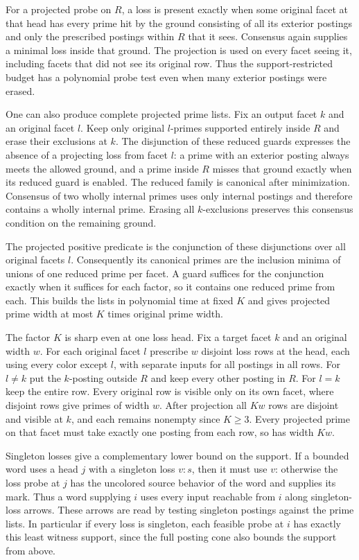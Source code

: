 For a projected probe on $R$, a loss is present
exactly when some original facet at that head has
every prime hit by the ground consisting of all
its exterior postings and only the prescribed
postings within $R$ that it sees. Consensus again
supplies a minimal loss inside that ground. The
projection is used on every facet seeing it,
including facets that did not see its original
row. Thus the support-restricted budget has a
polynomial probe test even when many exterior
postings were erased.

One can also produce complete projected prime lists.
Fix an output facet $k$ and an original facet $l$.
Keep only original $l$-primes supported entirely
inside $R$ and erase their exclusions at $k$. The
disjunction of these reduced guards expresses the
absence of a projecting loss from facet $l$: a
prime with an exterior posting always meets the
allowed ground, and a prime inside $R$ misses that
ground exactly when its reduced guard is enabled.
The reduced family is canonical after minimization.
Consensus of two wholly internal primes uses only
internal postings and therefore contains a wholly
internal prime. Erasing all $k$-exclusions preserves
this consensus condition on the remaining ground.

The projected positive predicate is the conjunction
of these disjunctions over all original facets $l$.
Consequently its canonical primes are the inclusion
minima of unions of one reduced prime per facet.
A guard suffices for the conjunction exactly when
it suffices for each factor, so it contains one
reduced prime from each. This builds the lists in
polynomial time at fixed $K$ and gives projected
prime width at most $K$ times original prime width.

The factor $K$ is sharp even at one loss head.
Fix a target facet $k$ and an original width $w$.
For each original facet $l$ prescribe $w$ disjoint
loss rows at the head, each using every color
except $l$, with separate inputs for all postings
in all rows. For $l\ne k$ put the $k$-posting
outside $R$ and keep every other posting in $R$.
For $l=k$ keep the entire row. Every original row
is visible only on its own facet, where disjoint
rows give primes of width $w$. After projection
all $Kw$ rows are disjoint and visible at $k$,
and each remains nonempty since $K\ge3$. Every
projected prime on that facet must take exactly
one posting from each row, so has width $Kw$.

Singleton losses give a complementary lower bound on
the support. If a bounded word uses a head $j$ with
a singleton loss $v:s$, then it must use $v$:
otherwise the loss probe at $j$ has the uncolored
source behavior of the word and supplies its mark.
Thus a word supplying $i$ uses every input reachable
from $i$ along singleton-loss arrows. These arrows
are read by testing singleton postings against the
prime lists. In particular if every loss is singleton,
each feasible probe at $i$ has exactly this least
witness support, since the full posting cone also
bounds the support from above.

